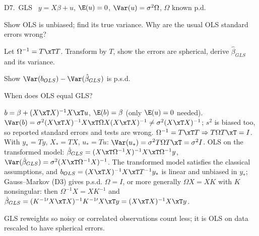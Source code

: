 \begin{qbox}{D7.\ GLS}{\likely\ \newtag}
$y=X\beta+u$, $\E(u)=0$, $\Var(u)=\sigma^{2}\Omega$, $\Omega$ known p.d.
\begin{flatlist}
  \item[(a)] Show OLS is unbiased; find its true variance. Why are the usual OLS standard errors wrong?
  \item[(b)] Let $\Omega^{-1}=T\xT T$. Transform by $T$, show the errors are spherical, derive $\hat\beta_{GLS}$ and its variance.
  \item[(c)] Show $\Var(b_{OLS})-\Var(\hat\beta_{GLS})$ is p.s.d.
  \item[(d)] When does OLS equal GLS?
\end{flatlist}
\end{qbox}
\begin{solbox}
 $b=\beta+(X\xT X)^{-1}X\xT u$, $\E(b)=\beta$ (only $\E(u)=0$ needed). $\Var(b)=\sigma^{2}(X\xT X)^{-1}X\xT\Omega X(X\xT X)^{-1}\ne\sigma^{2}(X\xT X)^{-1}$; $s^{2}$ is biased too,
so reported standard errors and tests are wrong.
 $\Omega^{-1}=T\xT T\Rightarrow T\Omega T\xT=I$. With $y_{*}=Ty$, $X_{*}=TX$, $u_{*}=Tu$: $\Var(u_{*})=\sigma^{2}T\Omega T\xT=\sigma^{2}I$. OLS on the transformed model:
$\hat\beta_{GLS}=(X\xT\Omega^{-1}X)^{-1}X\xT\Omega^{-1}y$, $\Var(\hat\beta_{GLS})=\sigma^{2}(X\xT\Omega^{-1}X)^{-1}$.
 The transformed model satisfies the classical assumptions, and $b_{OLS}=(X\xT X)^{-1}X\xT T^{-1}y_{*}$ is linear and unbiased in $y_{*}$; Gauss--Markov (D3) gives p.s.d.
 $\Omega=I$, or more generally $\Omega X=XK$ with $K$ nonsingular: then $\Omega^{-1}X=XK^{-1}$ and
$\hat\beta_{GLS}=(K^{-1\prime}X\xT X)^{-1}K^{-1\prime}X\xT y=(X\xT X)^{-1}X\xT y$.
\begin{why}\Why GLS reweights so noisy or correlated observations count less; it is OLS on data rescaled to have spherical errors.\end{why}
\end{solbox}

